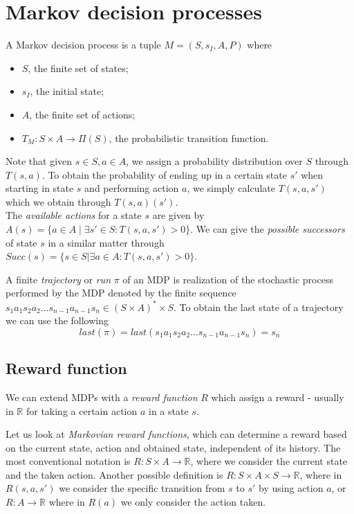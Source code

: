 \section*{Markov decision processes}

\begin{definition}[MDP]
	A Markov decision process is a tuple $M=(S,s_I,A,P)$ where 
	\begin{itemize}
		\item $S$, the finite set of states;
		\item $s_I$, the initial state;
		\item $A$, the finite set of actions;
		\item $T_{M}:S\times A\to \Pi(S)$, the probabilistic transition function.
	\end{itemize}
\end{definition}

Note that given $s\in S,a\in A$, we assign a probability distribution over $S$ through $T(s,a)$. To obtain the probability of ending up in a certain state $s'$ when starting in state $s$ and performing action $a$, we simply calculate $T(s,a,s')$ which we obtain through $T(s,a)(s')$.\\

The \textit{available actions} for a state $s$ are given by $A(s)=\{a\in A\mid \exists s'\in S: T(s,a,s')>0\}$. We can give the \textit{possible successors} of state $s$ in a similar matter through $Succ(s)=\{s\in S|\exists a\in A : T(s,a,s')>0\}$.

A finite \textit{trajectory} or \textit{run} $\pi$ of an MDP is realization of the stochastic process performed by the MDP denoted by the finite sequence $s_1 a_1 s_2 a_2\dots s_{n-1} a_{n-1} s_n \in (S\times A)^*\times S$. To obtain the last state of a trajectory we can use the following \[last(\pi)=last(s_1 a_1 s_2 a_2\dots s_{n-1} a_{n-1} s_n)=s_n\]

\subsection*{Reward function}
We can extend MDPs with a \textit{reward function} $R$ which assign a reward - usually in $\mathbb{R}$ for taking a certain action $a$ in a state $s$. 


Let us look at \textit{Markovian reward functions}, which can determine a reward based on the current state, action and obtained state, independent of its history. The most conventional notation is $R:S\times A\to \mathbb{R}$, where we consider the current state and the taken action. Another possible definition is $R:S\times A\times S\to\mathbb{R}$, where  in $R(s,a,s')$ we consider the specific transition from $s$ to $s'$ by using action $a$, or $R:A\to\mathbb{R}$ where in $R(a)$ we only consider the action taken. 

